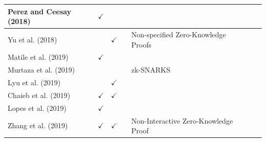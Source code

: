 \documentclass[../access.tex]{subfiles}
\begin{document}
\begin{table}[htbp]
\begin{adjustwidth}{-2cm}{}
\begin{tabular}{m{4.4cm} c >{\centering\arraybackslash}m{1.7cm} c >{\centering\arraybackslash}m{6cm} >{\centering\arraybackslash} m{1.0cm} >{\centering\arraybackslash}m{14.9cm}}
            \hline
            \footnotesize{Perez and Ceesay (2018) \cite{Perez2018}}        & $ \checkmark $                                       & {}                                   & {}                      & {}                                                                                       \\
            \hline
            \footnotesize{Yu et al. (2018) \cite{Yu2018}}                  & {}                                                   & $ \checkmark $                       & {}                      & \footnotesize{Non-specified Zero-Knowledge Proofs}                                       \\
            \hline
            \footnotesize{Matile et al. (2019) \cite{Matile2019}}          & $ \checkmark $                                       & {}                                   & {}                      & {}                                                                                       \\
            \hline
            \footnotesize{Murtaza et al. (2019) \cite{Murtaza2019}}        & {}                                                   & {}                                   & {}                      & \footnotesize{zk-SNARKS}                                                                 \\
            \hline
            \footnotesize{Lyu et al. (2019) \cite{Lyu2019}}                & {}                                                   & $ \checkmark $                       & {}                      & {}                                                                                       \\
            \hline
            \footnotesize{Chaieb et al. (2019) \cite{Chaieb2019}}          & $ \checkmark $                                       & $ \checkmark $                       & {}                      & {}                                                                                       \\
            \hline
            \footnotesize{Lopes et al. (2019) \cite{Lopes2019}}            & $ \checkmark $                                       & {}                                   & {}                      & {}                                                                                       \\
            \hline
            \footnotesize{Zhang et al. (2019) \cite{Zhang2019a}}           & $ \checkmark $                                       & $ \checkmark $                       & {}                      & \footnotesize{Non-Interactive Zero-Knowledge Proof}                                      \\

\end{tabular}
\end{adjustwidth}
\end{table}
\end{document}

